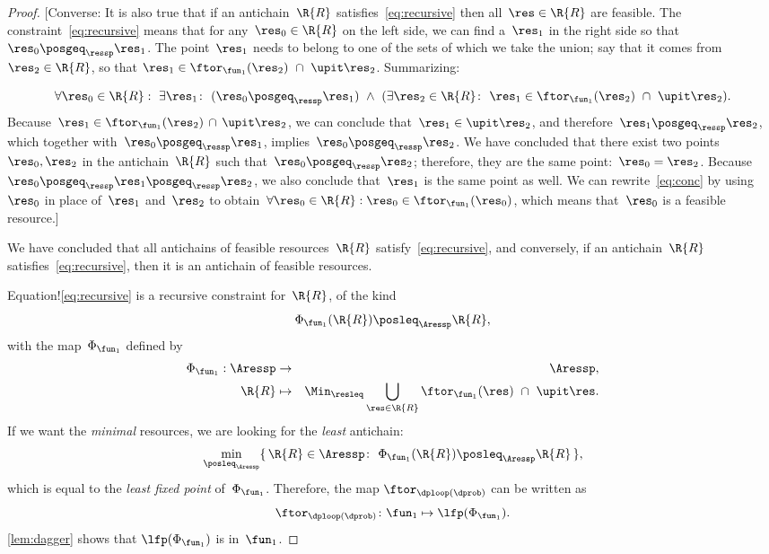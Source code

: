 \begin{proof}
  {[}Converse: It is also true that if an antichain~$\R{R}$ satisfies~\cref{eq:recursive}
  then all~$\res\in\R{R}$ are feasible. The constraint~\cref{eq:recursive}
  means that for any~$\res_{0}\in\R{R}$ on the left side, we can find
  a~$\res_{1}$ in the right side so that~$\res_{0}\posgeq_{\ressp}\res_{1}$.
  The point~$\res_{1}$ needs to belong to one of the sets of which
  we take the union; say that it comes from $\res_{2}\in\R{R}$, so
  that $\res_{1}\in\ftor_{\fun_{1}}(\res_{2})\ \cap\ \upit\res_{2}$.
  Summarizing:

    {\footnotesize{}
    \begin{equation}
      \forall\res_{0}\in\R{R}:\ \exists\res_{1}\colon\ (\res_{0}\posgeq_{\ressp}\res_{1})\ \wedge\ (\exists\res_{2}\in\R{R}\colon\ \res_{1}\in\ftor_{\fun_{1}}(\res_{2})\ \cap\ \upit\res_{2}).\label{eq:conc}
    \end{equation}
  }Because~$\res_{1}\in\ftor_{\fun_{1}}(\res_{2})\,\cap\,\upit\res_{2}$,
  we can conclude that~$\res_{1}\in\upit\res_{2}$, and therefore~$\res_{1}\posgeq_{\ressp}\res_{2}$,
  which together with~$\res_{0}\posgeq_{\ressp}\res_{1}$, implies~$\res_{0}\posgeq_{\ressp}\res_{2}$.
  We have concluded that there exist two points~$\res_{0},\res_{2}$
  in the antichain~$\R{R}$ such that~$\res_{0}\posgeq_{\ressp}\res_{2}$;
  therefore, they are the same point:~$\res_{0}=\res_{2}$. Because~$\res_{0}\posgeq_{\ressp}\res_{1}\posgeq_{\ressp}\res_{2}$,
  we also conclude that~$\res_{1}$ is the same point as well. We can
  rewrite~\cref{eq:conc} by using~$\res_{0}$ in place of~$\res_{1}$
  and~$\res_{2}$ to obtain~$\forall\res_{0}\in\R{R}:\res_{0}\in\ftor_{\fun_{1}}(\res_{0})$,
  which means that~$\res_{0}$ is a feasible resource.{]}

  We have concluded that all antichains of feasible resources~$\R{R}$
  satisfy~\cref{eq:recursive}, and conversely, if an antichain~$\R{R}$
  satisfies~\cref{eq:recursive}, then it is an antichain of feasible
  resources.

  Equation!\cref{eq:recursive} is a recursive constraint for~$\R{R}$,
  of the kind
  \[
    \Phi_{\fun_{1}}(\R{R})\posleq_{\Aressp}\R{R},
  \]
  with the map~$\Phi_{\fun_{1}}$ defined by
  \begin{eqnarray}
    \Phi_{\fun_{1}}:\Aressp & \rightarrow & \Aressp,\label{eq:bigphi}\\
    \R{R} & \mapsto & \Min_{\resleq}\bigcup_{\res\in\R{R}}\ftor_{\fun_{1}}(\res)\ \cap\ \upit\res.\nonumber
  \end{eqnarray}
  If we want the \emph{minimal} resources, we are looking for the \emph{least}
  antichain:
  \[
    \min_{\posleq_{\Aressp}}\{\,\R{R}\in\Aressp\colon\ \Phi_{\fun_{1}}(\R{R})\posleq_{\Aressp}\R{R}\,\},
  \]
  which is equal to the \emph{least fixed point }of~$\Phi_{\fun_{1}}$.
  Therefore, the map $\ftor_{\dploop(\dprob)}$ can be written as
  \begin{equation}
    \ftor_{\dploop(\dprob)}\colon\fun_{1}\mapsto\lfp(\Phi_{\fun_{1}}).\label{eq:loop_fixpoint}
  \end{equation}
  \cref{lem:dagger} shows that $\lfp(\Phi_{\fun_{1}})$ is \scottcontinuous
  in~$\fun_{1}$.
\end{proof}

